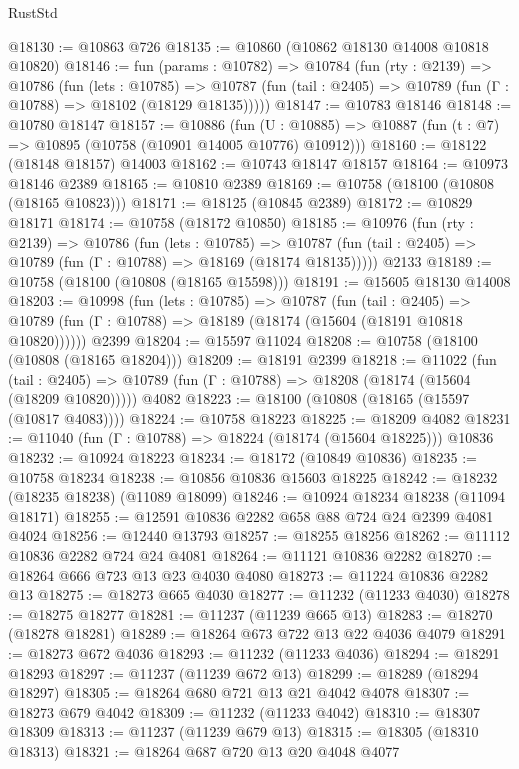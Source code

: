 \begin{lexlean}{RustStd}
\begin{coremodule}
@18130 := @10863 @726
@18135 := @10860 (@10862 @18130 @14008 @10818 @10820)
@18146 := fun (params : @10782) =>
  @10784
    (fun (rty : @2139) =>
    @10786
      (fun (lets : @10785) =>
      @10787 (fun (tail : @2405) => @10789 (fun (Γ : @10788) => @18102 (@18129 @18135)))))
@18147 := @10783 @18146
@18148 := @10780 @18147
@18157 := @10886
    (fun (U : @10885) => @10887 (fun (t : @7) => @10895 (@10758 (@10901 @14005 @10776) @10912)))
@18160 := @18122 (@18148 @18157) @14003
@18162 := @10743 @18147 @18157
@18164 := @10973 @18146 @2389
@18165 := @10810 @2389
@18169 := @10758 (@18100 (@10808 (@18165 @10823)))
@18171 := @18125 (@10845 @2389)
@18172 := @10829 @18171
@18174 := @10758 (@18172 @10850)
@18185 := @10976
    (fun (rty : @2139) =>
    @10786
      (fun (lets : @10785) =>
      @10787 (fun (tail : @2405) => @10789 (fun (Γ : @10788) => @18169 (@18174 @18135)))))
    @2133
@18189 := @10758 (@18100 (@10808 (@18165 @15598)))
@18191 := @15605 @18130 @14008
@18203 := @10998
    (fun (lets : @10785) =>
    @10787
      (fun (tail : @2405) =>
      @10789 (fun (Γ : @10788) => @18189 (@18174 (@15604 (@18191 @10818 @10820))))))
    @2399
@18204 := @15597 @11024
@18208 := @10758 (@18100 (@10808 (@18165 @18204)))
@18209 := @18191 @2399
@18218 := @11022
    (fun (tail : @2405) => @10789 (fun (Γ : @10788) => @18208 (@18174 (@15604 (@18209 @10820)))))
    @4082
@18223 := @18100 (@10808 (@18165 (@15597 (@10817 @4083))))
@18224 := @10758 @18223
@18225 := @18209 @4082
@18231 := @11040 (fun (Γ : @10788) => @18224 (@18174 (@15604 @18225))) @10836
@18232 := @10924 @18223
@18234 := @18172 (@10849 @10836)
@18235 := @10758 @18234
@18238 := @10856 @10836 @15603 @18225
@18242 := @18232 (@18235 @18238) (@11089 @18099)
@18246 := @10924 @18234 @18238 (@11094 @18171)
@18255 := @12591 @10836 @2282 @658 @88 @724 @24 @2399 @4081 @4024
@18256 := @12440 @13793
@18257 := @18255 @18256
@18262 := @11112 @10836 @2282 @724 @24 @4081
@18264 := @11121 @10836 @2282
@18270 := @18264 @666 @723 @13 @23 @4030 @4080
@18273 := @11224 @10836 @2282 @13
@18275 := @18273 @665 @4030
@18277 := @11232 (@11233 @4030)
@18278 := @18275 @18277
@18281 := @11237 (@11239 @665 @13)
@18283 := @18270 (@18278 @18281)
@18289 := @18264 @673 @722 @13 @22 @4036 @4079
@18291 := @18273 @672 @4036
@18293 := @11232 (@11233 @4036)
@18294 := @18291 @18293
@18297 := @11237 (@11239 @672 @13)
@18299 := @18289 (@18294 @18297)
@18305 := @18264 @680 @721 @13 @21 @4042 @4078
@18307 := @18273 @679 @4042
@18309 := @11232 (@11233 @4042)
@18310 := @18307 @18309
@18313 := @11237 (@11239 @679 @13)
@18315 := @18305 (@18310 @18313)
@18321 := @18264 @687 @720 @13 @20 @4048 @4077

\end{coremodule}
\end{lexlean}

